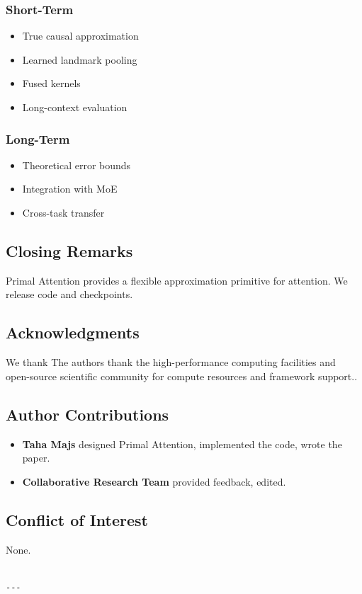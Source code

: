 \subsubsection{Short-Term}
\begin{itemize}
\item True causal approximation
\item Learned landmark pooling
\item Fused kernels
\item Long-context evaluation

\end{itemize}
\subsubsection{Long-Term}
\begin{itemize}
\item Theoretical error bounds
\item Integration with MoE
\item Cross-task transfer

\end{itemize}
\subsection{Closing Remarks}

Primal Attention provides a flexible approximation primitive for attention. 
We release code and checkpoints.

\subsection{Acknowledgments}

We thank The authors thank the high-performance computing facilities and open-source scientific community for compute resources and framework support..

\subsection{Author Contributions}

\begin{itemize}
\item \textbf{Taha Majs} designed Primal Attention, implemented the code, wrote the paper.
\item \textbf{Collaborative Research Team} provided feedback, edited.

\end{itemize}
\subsection{Conflict of Interest}

None.
\begin{lstlisting}

---
\end{lstlisting}